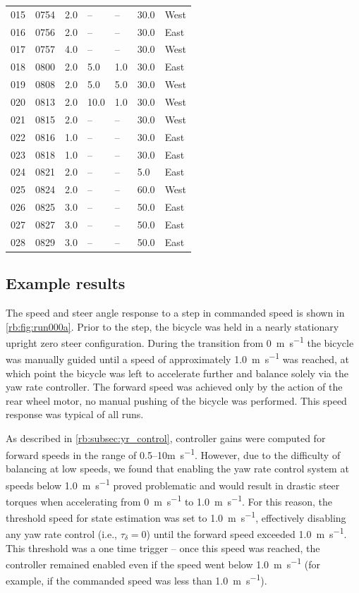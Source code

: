 \begin{center}
\begin{longtable}{lllllll}
  015 & 0754 & 2.0 & -- & -- & 30.0 & West \\
  016 & 0756 & 2.0 & -- & -- & 30.0 & East \\
  017 & 0757 & 4.0 & -- & -- & 30.0 & West \\
  018 & 0800 & 2.0 & 5.0 & 1.0 & 30.0 & East \\
  019 & 0808 & 2.0 & 5.0 & 5.0 & 30.0 & West \\
  020 & 0813 & 2.0 & 10.0 & 1.0 & 30.0 & West \\
  021 & 0815 & 2.0 & -- & -- & 30.0 & West \\
  022 & 0816 & 1.0 & -- & -- & 30.0 & East \\
  023 & 0818 & 1.0 & -- & -- & 30.0 & East \\
  024 & 0821 & 2.0 & -- & -- & 5.0 & East \\
  025 & 0824 & 2.0 & -- & -- & 60.0 & West \\
  026 & 0825 & 3.0 & -- & -- & 50.0 & East \\
  027 & 0827 & 3.0 & -- & -- & 50.0 & East \\
  028 & 0829 & 3.0 & -- & -- & 50.0 & East \\
  \bottomrule
  \end{longtable}
\end{center}

\subsection{Example results} \label{rb:subsec:results}
The speed and steer angle response to a step in commanded speed is shown in
\autoref{rb:fig:run000a}. Prior to the step, the bicycle was held in a nearly
stationary upright zero steer configuration.  During the transition from
\SI{0}{\m\per\s} the bicycle was manually guided until a speed of approximately
\SI{1.0}{\m\per\s} was reached, at which point the bicycle was left to
accelerate further and balance solely via the yaw rate controller. The forward
speed was achieved only by the action of the rear wheel motor, no manual
pushing of the bicycle was performed.  This speed response was typical of all
runs.

As described in \autoref{rb:subsec:yr_control}, controller gains were computed
for forward speeds in the range of 0.5--10\si{\m\per\s}. However, due to the
difficulty of balancing at low speeds, we found that enabling the yaw rate
control system at speeds below \SI{1.0}{\m\per\s} proved problematic and would
result in drastic steer torques when accelerating from \SI{0}{\m\per\s} to
\SI{1.0}{\m\per\s}. For this reason, the threshold speed for state estimation
was set to \SI{1.0}{\m\per\s}, effectively disabling any yaw rate control
(i.e., $\tau_\delta = 0$) until the forward speed exceeded \SI{1.0}{\m\per\s}.
This threshold was a one time trigger -- once this speed was reached, the
controller remained enabled even if the speed went below \SI{1.0}{\m\per\s}
(for example, if the commanded speed was less than \SI{1.0}{\m\per\s}).

